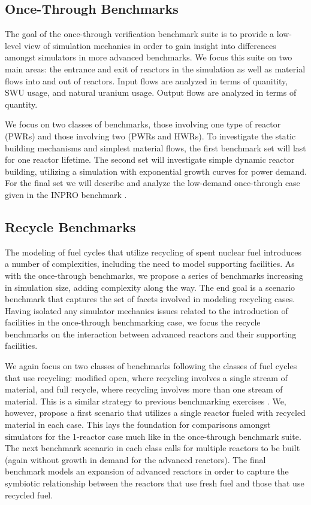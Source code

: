 \documentclass{anstrans}
\begin{document}
\subsection{Once-Through Benchmarks}
The goal of the once-through verification benchmark suite is to provide a
low-level view of simulation mechanics in order to gain insight into differences
amongst simulators in more advanced benchmarks. We focus this suite on two main
areas: the entrance and exit of reactors in the simulation as well as material
flows into and out of reactors. Input flows are analyzed in terms of quanitity,
SWU usage, and natural uranium usage. Output flows are analyzed in terms of
quantity.

We focus on two classes of benchmarks, those involving one type of reactor
(PWRs) and those involving two (PWRs and HWRs). To investigate the static
building mechanisms and simplest material flows, the first benchmark set will
last for one reactor lifetime. The second set will investigate simple dynamic
reactor building, utilizing a simulation with exponential growth curves for
power demand. For the final set we will describe and analyze the low-demand
once-through case given in the INPRO benchmark \cite{_international_2011}.

\subsection{Recycle Benchmarks}
The modeling of fuel cycles that utilize recycling of spent nuclear fuel
introduces a number of complexities, including the need to model supporting
facilities. As with the once-through benchmarks, we propose a series of
benchmarks increasing in simulation size, adding complexity along the way. The
end goal is a scenario benchmark that captures the set of facets involved in
modeling recycling cases. Having isolated any simulator mechanics issues related
to the introduction of facilities in the once-through benchmarking case, we
focus the recycle benchmarks on the interaction between advanced reactors and
their supporting facilities.

We again focus on two classes of benchmarks following the classes of fuel cycles
that use recycling: modified open, where recycling involves a single stream of
material, and full recycle, where recycling involves more than one stream of
material. This is a similar strategy to previous benchmarking exercises
\cite{boucher_specification_2008}. We, however, propose a first scenario that
utilizes a single reactor fueled with recycled material in each case. This lays
the foundation for comparisons amongst simulators for the 1-reactor case much
like in the once-through benchmark suite. The next benchmark scenario in each
class calls for multiple reactors to be built (again without growth in demand
for the advanced reactors). The final benchmark models an expansion of advanced
reactors in order to capture the symbiotic relationship between the reactors
that use fresh fuel and those that use recycled fuel. 
\end{document}
